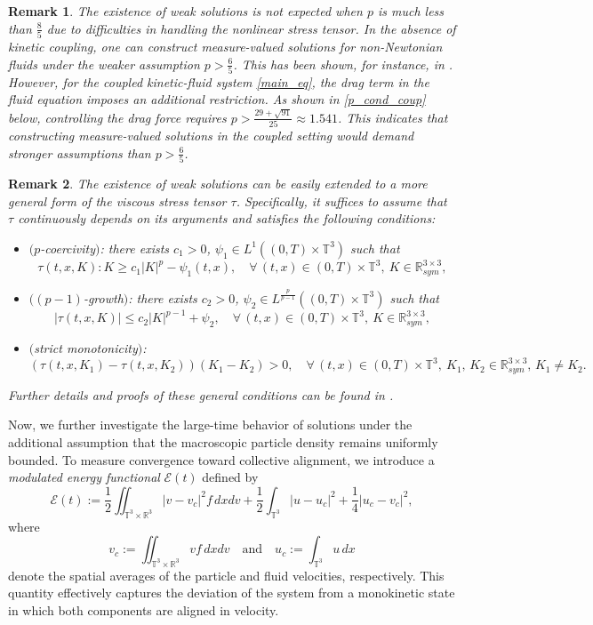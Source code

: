 \documentclass[10pt,reqno]{amsart}
\numberwithin{equation}{section}
\newtheorem{remark}{Remark}[section]
\newcommand{\R}{\mathbb R}
\newcommand{\T}{\mathbb T}
\newcommand{\bq}{\begin{equation}}
\newcommand{\eq}{\end{equation}}
\newcommand{\calE}{\mathcal{E}}
\newcommand{\intt}{\int_{\T^3}}
\newcommand{\inttr}{\iint_{\T^3 \times \R^3}}
\begin{document}
\begin{remark}
The existence of weak solutions is not expected when $p$ is much less than $\frac 85$ due to difficulties in handling the nonlinear stress tensor. In the absence of kinetic coupling, one can construct measure-valued solutions for non-Newtonian fluids under the weaker assumption $p> \frac 65$. This has been shown, for instance, in \cite[Chapter 5, Theorem 2.17]{MNRR96}. However, for the coupled kinetic-fluid system \eqref{main_eq}, the drag term in the fluid equation imposes an additional restriction. As shown in \eqref{p_cond_coup} below, controlling the drag force requires $p > \frac{29 + \sqrt{91}}{25} \approx 1.541$. This indicates that constructing measure-valued solutions in the coupled setting would demand stronger assumptions than $p> \frac 65$.
\end{remark}

 
\begin{remark}
The existence of weak solutions can be easily extended to a more general form of the viscous stress tensor $\tau$. Specifically, it suffices to assume that $\tau$ continuously depends on its arguments and satisfies the following conditions:
\begin{itemize}
\item $($$p$-coercivity$)$: there exists $c_1 >0$, $\psi_1 \in L^1((0,T) \times \T^3)$ such that
$$\tau(t,x, K) : K  \geq c_1 |K|^p - \psi_1(t,x), \quad \forall \,  (t,x) \in (0,T) \times \T^3, \ K \in \R^{3\times 3}_{sym},$$
\item $($$(p-1)$-growth$)$:  there exists $c_2 >0$, $\psi_2 \in L^{\frac{p}{p-1}}((0,T) \times \T^3)$ such that
	$$| \tau(t,x,K) | \leq  c_2 |K|^{p-1} + \psi_2, \quad\forall \,  (t,x) \in (0,T) \times \T^3, \ K \in \R^{3\times 3}_{sym},$$
\item $($strict monotonicity$)$:
\bq\label{st.mt}
(\tau(t,x,K_1) - \tau(t,x,K_2))( K_1 - K_2 ) > 0, \quad \forall \,  (t,x) \in (0,T) \times \T^3, \ K_1, \, K_2 \in \R^{3\times 3}_{sym}, \,K_1 \neq K_2.
\eq
\end{itemize}
Further details and proofs of these general conditions can be found in \cite{FMS97,FMS00,MNRR96}.
\end{remark}
 

Now, we further investigate the large-time behavior of solutions under the additional assumption that the macroscopic particle density remains uniformly bounded. To measure convergence toward collective alignment, we introduce a {\it modulated energy functional} $\calE(t)$ defined by
\[
\calE(t) := \frac12\inttr |v - v_c|^2 f\,dxdv + \frac12\intt |u - u_c|^2 + \frac14|u_c - v_c|^2,
\]
where 
\[
v_c := \inttr vf\,dxdv \quad \mbox{and} \quad u_c:= \intt u\,dx
\]
denote the spatial averages of the particle and fluid velocities, respectively. This quantity effectively captures the deviation of the system from a monokinetic state in which both components are aligned in velocity.
\end{document}
